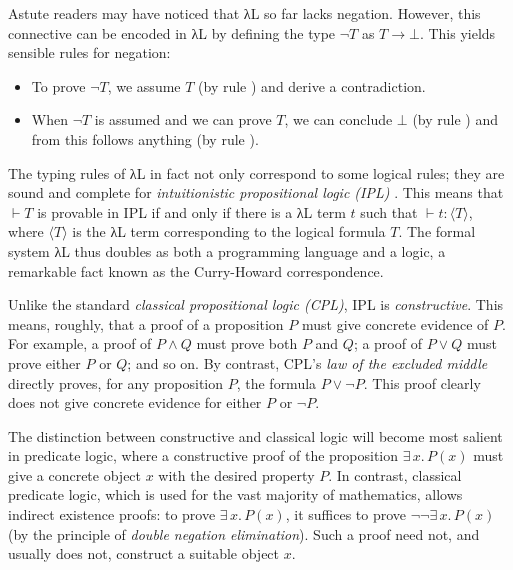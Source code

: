 \documentclass{article}
\theoremstyle{definition}
\newcommand{\Ex}[2]{∃\,#1.\, #2}
\newcommand{\lbl}[1]{\RightTirNameStyle{#1}}
\begin{document}
Astute readers may have noticed that λL so far lacks negation.
However, this connective can be encoded in λL by defining the type $¬ T$ as $T → ⊥$.
This yields sensible rules for negation:
\begin{itemize}
  \item To prove $¬ T$, we assume $T$ (by rule \lbl{Abs}) and derive a contradiction.
  \item When $¬ T$ is assumed and we can prove $T$, we can conclude $⊥$ (by rule \lbl{App}) and from this follows anything (by rule \lbl{Absurd}).
\end{itemize}

The typing rules of λL in fact not only correspond to some logical rules; they are sound and complete for \emph{intuitionistic propositional logic (IPL)} .
This means that $⊢ T$ is provable in IPL if and only if there is a λL term $t$ such that $⊢ t : ⟨T⟩$, where $⟨T⟩$ is the λL term corresponding to the logical formula $T$.
The formal system λL thus doubles as both a programming language and a logic, a remarkable fact known as the Curry-Howard correspondence.

Unlike the standard \emph{classical propositional logic (CPL)}, IPL is \emph{constructive}.
This means, roughly, that a proof of a proposition $P$ must give concrete evidence of $P$.
For example, a proof of $P ∧ Q$ must prove both $P$ and $Q$; a proof of $P ∨ Q$ must prove either $P$ or $Q$; and so on.
By contrast, CPL's \emph{law of the excluded middle} directly proves, for any proposition $P$, the formula $P ∨ ¬ P$.
This proof clearly does not give concrete evidence for either $P$ or $¬ P$.

The distinction between constructive and classical logic will become most salient in predicate logic, where a constructive proof of the proposition $\Ex{x}{P(x)}$ must give a concrete object $x$ with the desired property $P$.
In contrast, classical predicate logic, which is used for the vast majority of mathematics, allows indirect existence proofs:
to prove $\Ex{x}{P(x)}$, it suffices to prove $¬¬ \Ex{x}{P(x)}$ (by the principle of \emph{double negation elimination}).
Such a proof need not, and usually does not, construct a suitable object $x$.
\end{document}
